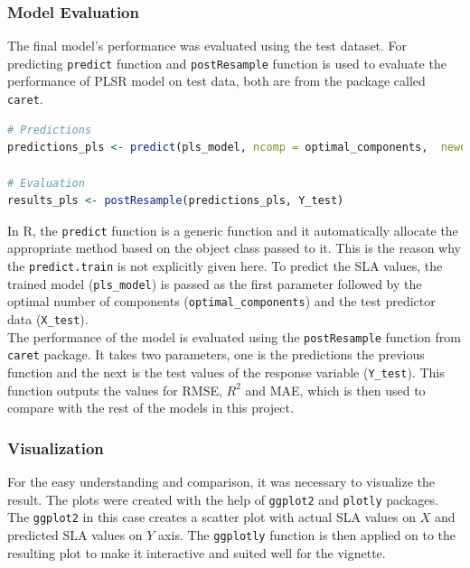 \documentclass[12pt,a4paper]{report}
\begin{document}
\subsubsection*{Model Evaluation}
The final model's performance was evaluated using the test dataset. For predicting \texttt{predict} function and \texttt{postResample} function is used to evaluate the performance of PLSR model on test data, both are from the package called \texttt{caret}. \\

\begin{lstlisting}[language=R, style=mystyle]
# Predictions
predictions_pls <- predict(pls_model, ncomp = optimal_components,  newdata = X_test)

# Evaluation
results_pls <- postResample(predictions_pls, Y_test)
\end{lstlisting}

In R, the \texttt{predict} function is a generic function and it automatically allocate the appropriate method based on the object class passed to it. This is the reason why the \texttt{predict.train} is not explicitly given here. To predict the SLA values, the trained model (\texttt{pls\_model}) is passed as the first parameter followed by  the optimal number of components (\texttt{optimal\_components}) and the test predictor data (\texttt{X\_test}). \\

The performance of the model is evaluated using the \texttt{postResample} function from \texttt{caret} package. It takes two parameters, one is the predictions the previous function and the next is the test values of the response variable (\texttt{Y\_test}). This function outputs the values for RMSE, $R^2$ and MAE, which is then used to compare with the rest of the models in this project.

\subsubsection*{Visualization}
For the easy understanding and comparison, it was necessary to visualize the result. The plots were created with the help of \texttt{ggplot2} and \texttt{plotly} packages. The \texttt{ggplot2} in this case creates a scatter plot with actual SLA values on $X$ and predicted SLA values on $Y$ axis. The \texttt{ggplotly} function is then applied on to the resulting plot to make it interactive and suited well for the vignette.
\end{document}
